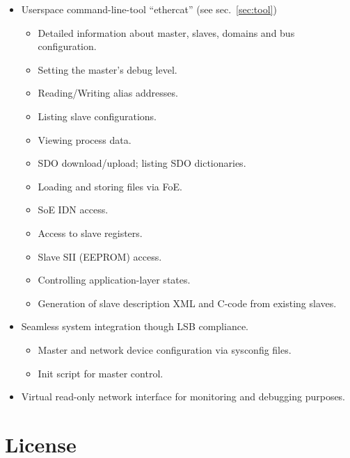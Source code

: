 \documentclass[a4paper,12pt,BCOR6mm,bibtotoc,idxtotoc]{scrbook}
\begin{document}
\begin{itemize}
\begin{itemize}
  \end{itemize}

\item Userspace command-line-tool ``ethercat'' (see sec.~\ref{sec:tool})

  \begin{itemize}

  \item Detailed information about master, slaves, domains and bus
  configuration.
  \item Setting the master's debug level.
  \item Reading/Writing alias addresses.
  \item Listing slave configurations.
  \item Viewing process data.
  \item SDO download/upload; listing SDO dictionaries.
  \item Loading and storing files via FoE.
  \item SoE IDN access.
  \item Access to slave registers.
  \item Slave SII (EEPROM) access.
  \item Controlling application-layer states.
  \item Generation of slave description XML and C-code from existing slaves.

  \end{itemize}

\item Seamless system integration though LSB compliance.

  \begin{itemize}

  \item Master and network device configuration via sysconfig files.

  \item Init script for master control.

  \end{itemize}

\item Virtual read-only network interface for monitoring and debugging
  purposes.

\end{itemize}


\section{License}
\label{sec:license}
\end{document}
